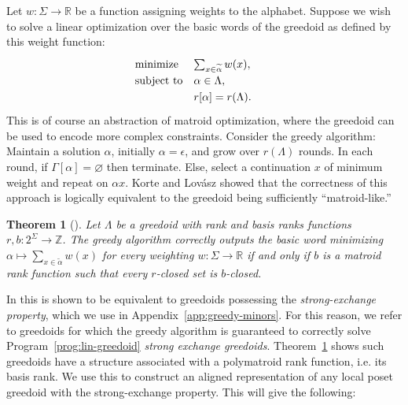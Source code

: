 \documentclass[11pt]{article}
\newtheorem{theorem}{Theorem}[section]
\newcommand{\univ}{\Sigma}
\newcommand{\glang}{\Lambda}
\begin{document}
Let $w: \univ\to\mathbb{R}$ be a function assigning weights to the alphabet.
Suppose we wish to solve a linear optimization over the basic words of the greedoid as defined by this weight function:
\begin{equation}\label{prog:lin-greedoid}
    \def\arraystretch{1.25}
    \begin{array}{lll}
        \text{minimize}  & \sum_{x \in\widetilde{\alpha}}w(x),\quad & \\
        \text{subject to}& \alpha\in\glang, \quad & \\
                         & r[\alpha] = r(\glang). \quad &
    \end{array}
\end{equation}
This is of course an abstraction of matroid optimization, where the greedoid can be used to encode more complex constraints.
Consider the greedy algorithm:
Maintain a solution $\alpha$, initially $\alpha=\epsilon$, and grow over $r(\glang)$ rounds.
In each round, if $\Gamma[\alpha]=\varnothing$ then terminate.
Else, select a continuation $x$ of minimum weight and repeat on $\alpha x$.
Korte and Lovász showed that the correctness of this approach is logically equivalent to the greedoid being sufficiently ``matroid-like.''

\begin{theorem}[\cite{korte1984greedoids}]\label{thm:greedy}
    Let $\glang$ be a greedoid with rank and basis ranks functions $r,b:2^\univ\to\mathbb{Z}$.
    The greedy algorithm correctly outputs the basic word minimizing $\alpha\mapsto \sum_{x\in\widetilde{\alpha}}w(x)$ for every weighting $w:\univ\to\mathbb{R}$ if and only if $b$ is a matroid rank function such that every $r$-closed set is $b$-closed.
\end{theorem}

In \cite{korte1984greedoids,goetschel1986linear} this is shown to be equivalent to greedoids possessing the \emph{strong-exchange property}, which we use in Appendix~\ref{app:greedy-minors}.
For this reason, we refer to greedoids for which the greedy algorithm is guaranteed to correctly solve Program~\ref{prog:lin-greedoid} \emph{strong exchange greedoids}.
Theorem~\ref{thm:greedy} shows such greedoids have a structure associated with a polymatroid rank function, i.e. its basis rank.
We use this to construct an aligned representation of any local poset greedoid with the strong-exchange property.
This will give the following:
\end{document}
